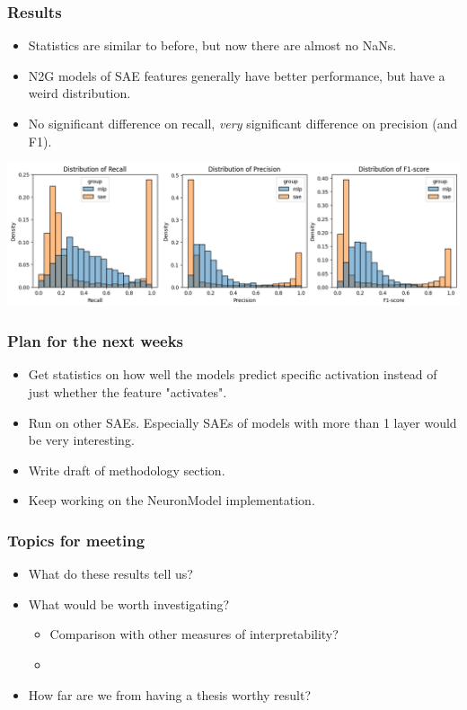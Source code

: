 \documentclass[aspectratio=169]{beamer}
\begin{document}
\begin{frame}[fragile=singleslide]
    \frametitle{Results}
    \begin{itemize}
        \item Statistics are similar to before, but now there are almost no NaNs.
        \item N2G models of SAE features generally have better performance, but have a weird distribution.
        \item No significant difference on recall, \emph{very} significant difference on precision (and F1).
    \end{itemize}
    \begin{center}
        \includegraphics[width=\linewidth]{images/histogram.png}
    \end{center}
\end{frame}
\begin{frame}[fragile=singleslide]
    \frametitle{Plan for the next weeks}
    \begin{itemize}
        \item Get statistics on how well the models predict specific activation instead of just whether the feature "activates".
        \item Run on other SAEs. Especially SAEs of models with more than 1 layer would be very interesting.
        \item Write draft of methodology section.
        \item Keep working on the NeuronModel implementation.
    \end{itemize}
\end{frame}
\begin{frame}[fragile=singleslide]
    \frametitle{Topics for meeting}
    \begin{itemize}
        \item What do these results tell us?
        \item What would be worth investigating?
        \begin{itemize}
            \item Comparison with other measures of interpretability?
            \item 
        \end{itemize}
        \item How far are we from having a thesis worthy result?
    \end{itemize}
\end{frame}
\end{document}

